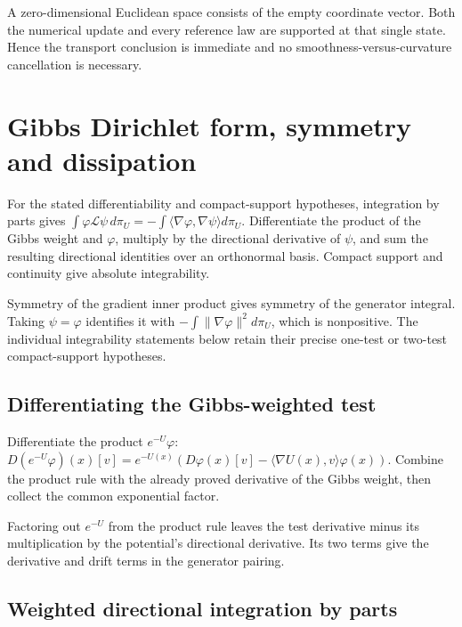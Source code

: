 \documentclass[11pt,a4paper]{report}
\begin{document}
A zero-dimensional Euclidean space consists of the empty coordinate vector. Both the numerical update and every reference law are supported at that single state. Hence the transport conclusion is immediate and no smoothness-versus-curvature cancellation is necessary.

\section{\texorpdfstring{Gibbs Dirichlet form, symmetry and dissipation}{Gibbs Dirichlet form, symmetry and dissipation}}
\label{proof-module-UnadjustedLangevin-GeneratorDirichlet-lean}


For the stated differentiability and compact-support hypotheses, integration by parts gives \(\int\varphi\mathcal L\psi\,d\pi_U=-\int\langle\nabla\varphi,\nabla\psi\rangle d\pi_U\). Differentiate the product of the Gibbs weight and \(\varphi\), multiply by the directional derivative of \(\psi\), and sum the resulting directional identities over an orthonormal basis. Compact support and continuity give absolute integrability.



Symmetry of the gradient inner product gives symmetry of the generator integral. Taking \(\psi=\varphi\) identifies it with \(-\int\|\nabla\varphi\|^2d\pi_U\), which is nonpositive. The individual integrability statements below retain their precise one-test or two-test compact-support hypotheses.

\subsection{\texorpdfstring{Differentiating the Gibbs-weighted test}{Differentiating the Gibbs-weighted test}}
\label{report-step-UnadjustedLangevin-GeneratorDirichlet-lean-1}


Differentiate the product \(e^{-U}\varphi\): \(D(e^{-U}\varphi)(x)[v]=e^{-U(x)}(D\varphi(x)[v]-\langle\nabla U(x),v\rangle\varphi(x))\). Combine the product rule with the already proved derivative of the Gibbs weight, then collect the common exponential factor.



Factoring out \(e^{-U}\) from the product rule leaves the test derivative minus its multiplication by the potential's directional derivative. Its two terms give the derivative and drift terms in the generator pairing.

\subsection{\texorpdfstring{Weighted directional integration by parts}{Weighted directional integration by parts}}
\label{report-step-UnadjustedLangevin-GeneratorDirichlet-lean-2}
\end{document}
